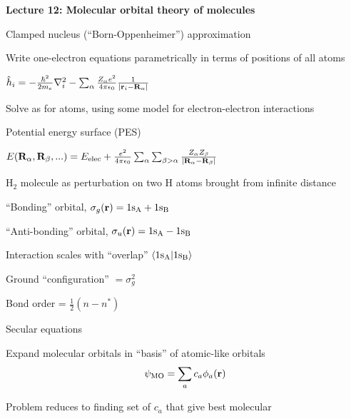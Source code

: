 \message{ !name(Outline.tex)}\documentclass[11pt]{article}
\begin{document}
\begin{outline}
 \item {\bf Lecture 12: Molecular orbital theory of molecules}
   \begin{outline}
   \item Clamped nucleus (``Born-Oppenheimer'') approximation
     \begin{outline}
     \item Write one-electron equations parametrically in terms of positions of
     all atoms
   \item   $\hat h_i = -\frac{\hbar^2}{2m_e}\nabla^2_i-\sum_\alpha \frac{Z_\alpha
         e^2}{4\pi\epsilon_0}\frac{1}{|{\bf r}_i-{\bf R}_\alpha|}$
     \item Solve as for atoms, using some model for electron-electron interactions
     \item Potential energy surface (PES)
       \begin{outline}
       \item $E({\bf R}_\alpha, {\bf
           R}_\beta,...)=E_\mathrm{elec}+\frac{e^2}{4\pi\epsilon_0}\sum_\alpha\sum_{\beta>\alpha}\frac{Z_\alpha
           Z_\beta}{|{\bf R}_\alpha-{\bf R}_\beta|}$ 
       \end{outline}
     \end{outline}
   \item H$_2$ molecule as perturbation on two H atoms brought from infinite distance
     \begin{outline}
       \item ``Bonding'' orbital, $\sigma_g({\bf r}) = 1{\rm s_A}+1{\rm s_B}$
       \item ``Anti-bonding'' orbital, $\sigma_u({\bf r}) = 1{\rm s_A}-1{\rm s_B}$
       \item Interaction scales with ``overlap'' $\langle 1{\rm s_A} | 1{\rm
           s_B} \rangle$
       \item Ground ``configuration'' $=\sigma_g^2$
       \item Bond order = $\frac{1}{2}(n-n^*)$
     \end{outline}
   \item Secular equations
     \begin{outline}
     \item Expand molecular orbitals in ``basis'' of atomic-like orbitals
       \begin{equation}
         \psi_\mathrm{MO}=\sum_a c_a\phi_a({\bf r})
       \end{equation}
     \item Problem reduces to finding set of $c_a$ that give best molecular

\end{outline}
\end{outline}
\end{outline}
\end{document}
